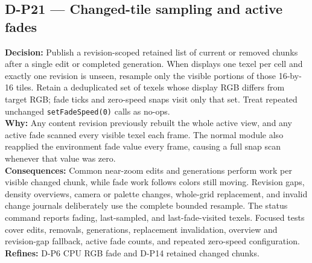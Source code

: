 \subsection*{D-P21 --- Changed-tile sampling and active fades}
\begin{decisionbox}[title={D-P21 \quad 2026-08-09}]
\textbf{Decision:} Publish a revision-scoped retained list of current or
removed chunks after a single edit or completed generation. When
 displays one texel per cell and exactly one revision is
unseen, resample only the visible portions of those 16-by-16 tiles. Retain a
deduplicated set of texels whose display RGB differs from target RGB; fade
ticks and zero-speed snaps visit only that set. Treat repeated unchanged
\texttt{setFadeSpeed(0)} calls as no-ops.\\
\textbf{Why:} Any content revision previously rebuilt the whole active view,
and any active fade scanned every visible texel each frame. The normal module
also reapplied the environment fade value every frame, causing a full snap
scan whenever that value was zero.\\
\textbf{Consequences:} Common near-zoom edits and generations perform work per
visible changed chunk, while fade work follows colors still moving. Revision
gaps, density overviews, camera or palette changes, whole-grid replacement,
and invalid change journals deliberately use the complete bounded resample.
The status command reports fading, last-sampled, and last-fade-visited texels.
Focused tests cover edits, removals, generations, replacement invalidation,
overview and revision-gap fallback, active fade counts, and repeated zero-speed
configuration.\\
\textbf{Refines:} D-P6 CPU RGB fade and D-P14 retained changed chunks.
\end{decisionbox}

